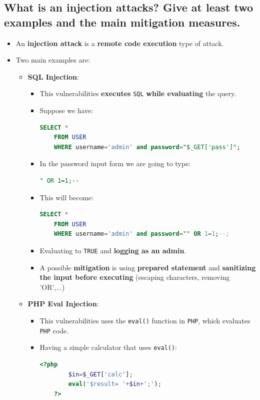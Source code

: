 \documentclass[9pt, letterpaper]{article}
\begin{document}
\subsection{What is an injection attacks? Give at least two examples and the main mitigation measures.}
\begin{itemize}
	\item An \textbf{injection attack} is a \textbf{remote code execution} type of attack.
	\item Two main examples are:
	\begin{itemize}
		\item \textbf{SQL Injection}:
		\begin{itemize}
			\item This vulnerabilities \textbf{executes} {\tt SQL} \textbf{while evaluating} the query.
			\item Suppose we have:
\begin{lstlisting}[language=SQL, xrightmargin=0.07\textwidth]
	SELECT * 
	FROM USER 
	WHERE username='admin' and password="$_GET['pass']";
\end{lstlisting}
			\item In the password input form we are going to type:
\begin{lstlisting}[language=SQL]
	" OR 1=1;--
\end{lstlisting}
			\item This will become:
\begin{lstlisting}[language=SQL, xrightmargin=0.1\textwidth]
	SELECT * 
	FROM USER 
	WHERE username='admin' and password="" OR 1=1;--;
\end{lstlisting}
			\item Evaluating to {\tt TRUE} and \textbf{logging as an admin}.
			\item A possible \textbf{mitigation} is using \textbf{prepared statement} and \textbf{sanitizing the input before executing} (escaping characters, removing 'OR',...)
		\end{itemize}
		\item \textbf{PHP Eval Injection}:
		\begin{itemize}
			\item This vulnerabilities uses the {\tt eval()} function in {\tt PHP}, which evaluates {\tt PHP} code.
			\item Having a simple calculator that uses {\tt eval()}:
\begin{lstlisting}[language=PHP]
	<?php
		$in=$_GET['calc'];
		eval('$result= '+$in+';');
	?>
\end{lstlisting}

\end{itemize}
\end{itemize}
\end{itemize}
\end{document}
